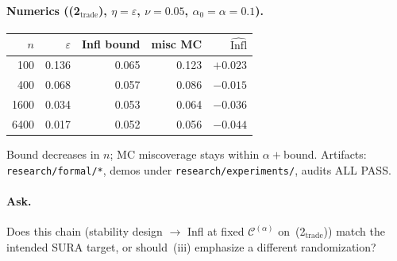 \documentclass[11pt]{article}
\begin{document}
\paragraph{Numerics ((2$_{\mathrm{trade}}$), \(\eta=\varepsilon\), \(\nu=0.05\), \(\alpha_0=\alpha=0.1\)).}
\begin{center}
\small
\begin{tabular}{rrrrr}
\toprule
$n$ & $\varepsilon$ & Infl bound & misc MC & $\widehat{\mathrm{Infl}}$ \\
\midrule
100 & 0.136 & 0.065 & 0.123 & $+0.023$ \\
400 & 0.068 & 0.057 & 0.086 & $-0.015$ \\
1600 & 0.034 & 0.053 & 0.064 & $-0.036$ \\
6400 & 0.017 & 0.052 & 0.056 & $-0.044$ \\
\bottomrule
\end{tabular}
\end{center}
\vspace{-0.3em}
Bound decreases in \(n\); MC miscoverage stays within \(\alpha+\)bound.
Artifacts: \texttt{research/formal/*}, demos under \texttt{research/experiments/}, audits ALL PASS.

\paragraph{Ask.}
Does this chain (stability design \(\to\) Infl at fixed \(\mathcal{C}^{(\alpha)}\) on~(2$_{\mathrm{trade}}$)) match the intended SURA target, or should~(iii) emphasize a different randomization?
\end{document}
